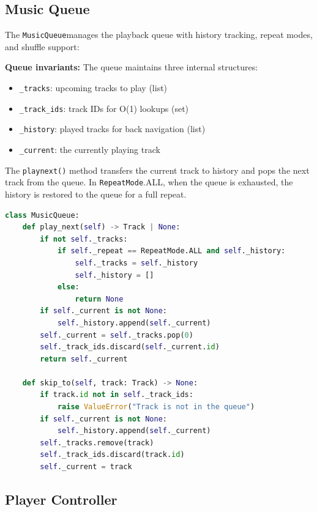 \documentclass[a4paper,11pt,twoside]{article}
\newcommand{\repeatmode}{\texttt{RepeatMode}}
\newcommand{\musicqueue}{\texttt{MusicQueue}}
\DeclareRobustCommand{\method}[1]{\texttt{\def\_{\textunderscore\allowbreak}#1}}
\begin{document}
\subsection{Music Queue}

The \musicqueue manages the playback queue with history tracking, repeat
modes, and shuffle support:

\begin{archbox}
\textbf{Queue invariants:} The queue maintains three internal structures:
\begin{itemize}
    \item \texttt{\_tracks}: upcoming tracks to play (list)
    \item \texttt{\_track\_ids}: track IDs for O(1) lookups (set)
    \item \texttt{\_history}: played tracks for back navigation (list)
    \item \texttt{\_current}: the currently playing track
\end{itemize}
The \method{play\_next()} method transfers the current track to history
and pops the next track from the queue. In \repeatmode.ALL, when the
queue is exhausted, the history is restored to the queue for a full repeat.
\end{archbox}

\begin{lstlisting}[language=Python, caption={Core queue operations.}]
class MusicQueue:
    def play_next(self) -> Track | None:
        if not self._tracks:
            if self._repeat == RepeatMode.ALL and self._history:
                self._tracks = self._history
                self._history = []
            else:
                return None
        if self._current is not None:
            self._history.append(self._current)
        self._current = self._tracks.pop(0)
        self._track_ids.discard(self._current.id)
        return self._current

    def skip_to(self, track: Track) -> None:
        if track.id not in self._track_ids:
            raise ValueError("Track is not in the queue")
        if self._current is not None:
            self._history.append(self._current)
        self._tracks.remove(track)
        self._track_ids.discard(track.id)
        self._current = track
\end{lstlisting}

\subsection{Player Controller}
\end{document}
